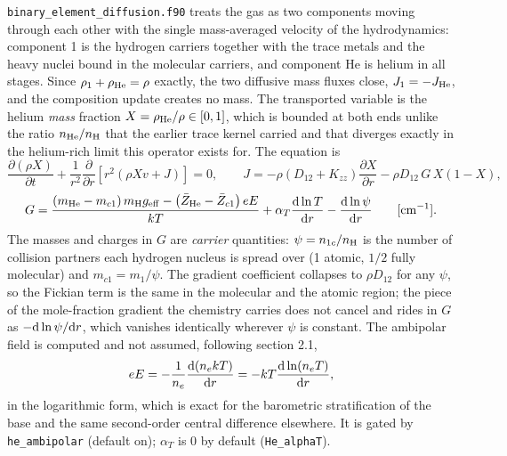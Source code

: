\texttt{binary\_element\_diffusion.f90} treats the gas as two components
moving through each other with the single mass-averaged velocity of the
hydrodynamics: component 1 is the hydrogen carriers together with the trace
metals and the heavy nuclei bound in the molecular carriers, and component
He is helium in all stages. Since $\rho_1+\rho_{\rm He}=\rho$ exactly, the
two diffusive mass fluxes close, $J_1=-J_{\rm He}$, and the composition
update creates no mass. The transported variable is the helium \emph{mass}
fraction $X = \rho_{\rm He}/\rho\in[0,1]$, which is bounded at both ends
unlike the ratio $n_{\rm He}/n_{\rm H}$ that the earlier trace kernel
carried and that diverges exactly in the helium-rich limit this operator
exists for. The equation is
\begin{equation}
\frac{\partial(\rho X)}{\partial t}
 + \frac{1}{r^{2}}\frac{\partial}{\partial r}
   \left[r^{2}\left(\rho X v + J\right)\right] = 0,
\qquad
J = -\rho\left(D_{12}+K_{zz}\right)\frac{\partial X}{\partial r}
    - \rho D_{12}\,G\,X(1-X),
\label{eq:mol:hediff}
\end{equation}
\begin{equation}
G = \frac{\left(m_{\rm He}-m_{c1}\right)m_{\rm H}g_{\rm eff}
          -\left(\bar Z_{\rm He}-\bar Z_{c1}\right)eE}{kT}
   + \alpha_T\frac{{\rm d}\ln T}{{\rm d}r}
   - \frac{{\rm d}\ln\psi}{{\rm d}r}\qquad[{\rm cm^{-1}}].
\label{eq:mol:hedriftG}
\end{equation}
The masses and charges in $G$ are \emph{carrier} quantities:
$\psi = n_{1c}/n_{\rm H}$ is the number of collision partners each hydrogen
nucleus is spread over (1 atomic, $1/2$ fully molecular) and
$m_{c1}=m_1/\psi$. The gradient coefficient collapses to $\rho D_{12}$ for
any $\psi$, so the Fickian term is the same in the molecular and the atomic
region; the piece of the mole-fraction gradient the chemistry carries does
not cancel and rides in $G$ as $-{\rm d}\ln\psi/{\rm d}r$, which vanishes
identically wherever $\psi$ is constant. The ambipolar field is computed and
not assumed, following \citet{Koskinen2013} section 2.1,
\begin{equation}
eE = -\frac{1}{n_e}\frac{{\rm d}(n_ekT)}{{\rm d}r}
   = -kT\frac{{\rm d}\ln(n_eT)}{{\rm d}r},
\label{eq:mol:ambipolar}
\end{equation}
in the logarithmic form, which is exact for the barometric stratification of
the base and the same second-order central difference elsewhere. It is
gated by \texttt{he\_ambipolar} (default on); $\alpha_T$ is 0 by default
(\texttt{He\_alphaT}).

